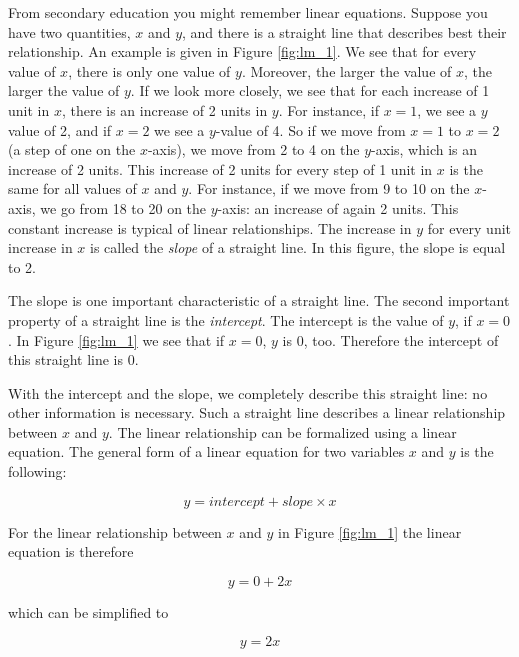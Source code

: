 \documentclass[]{book}\usepackage[]{graphicx}\usepackage[]{color}
\begin{document}
From secondary education you might remember linear equations. Suppose you have two quantities, $x$ and $y$, and there is a straight line that describes best their relationship. An example is given in Figure \ref{fig:lm_1}. We see that for every value of $x$, there is only one value of $y$. Moreover, the larger the value of $x$, the larger the value of $y$. If we look more closely, we see that for each increase of 1 unit in $x$, there is an increase of 2 units in $y$. For instance, if $x=1$, we see a $y$ value of 2, and if $x=2$ we see a $y$-value of 4. So if we move from $x=1$ to $x=2$ (a step of one on the $x$-axis), we move from 2 to 4 on the $y$-axis, which is an increase of 2 units. This increase of 2 units for every step of 1 unit in $x$ is the same for all values of $x$ and $y$. For instance, if we move from 9 to 10 on the $x$-axis, we go from 18 to 20 on the $y$-axis: an increase of again 2 units. This constant increase is typical of linear relationships. The increase in $y$ for every unit increase in $x$ is called the \textit{slope} of a straight line. In this figure, the slope is equal to 2.

The slope is one important characteristic of a straight line. The second important property of a straight line is the \textit{intercept}. The intercept is the value of $y$, if $x=0$. In Figure \ref{fig:lm_1} we see that if $x=0$, $y$ is 0, too. Therefore the intercept of this straight line is 0.

With the intercept and the slope, we completely describe this straight line: no other information is necessary. Such a straight line describes a linear relationship between $x$ and $y$. The linear relationship can be formalized using a linear equation. The general form of a linear equation for two variables $x$ and $y$ is the following:

\begin{equation}
y = intercept + slope \times x
\end{equation}


For the linear relationship between $x$ and $y$ in Figure \ref{fig:lm_1} the linear equation is therefore

\begin{equation}
y = 0 + 2 x
\end{equation}

which can be simplified to

\begin{equation}
y =  2 x
\end{equation}
\end{document}
